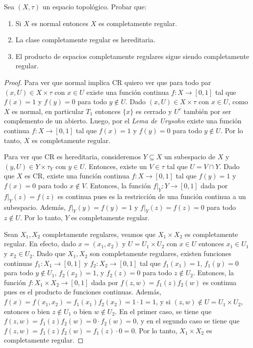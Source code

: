 \documentclass{article}
\theoremstyle{plain}
\theoremstyle{definition}
\newenvironment{ejercicio}[1]{\begin{trivlist}
\item[\hskip \labelsep {\bfseries Ejercicio}\hskip \labelsep {\bfseries #1.}]}{\end{trivlist}}
\begin{document}
\begin{ejercicio}{1}
    Sea \( (X, \tau) \) un espacio topológico. Probar que:
    \begin{enumerate}
        \item Si \( X \) es normal entonces \( X \) es completamente regular.
        \item La clase completamente regular es hereditaria.
        \item El producto de espacios completamente regulares sigue siendo completamente regular.
    \end{enumerate}
\end{ejercicio}
\begin{proof}
    Para ver que normal implica CR quiero ver que para todo par \( (x, U) \in X \times \tau \) con \( x \in U \) existe una función continua \( f : X \to [0, 1] \) tal que \( f(x) = 1 \) y \( f(y) = 0 \) para todo \( y \notin U \).
    Dado \( (x, U) \in X \times \tau \) con \( x \in U \), como \( X \) es normal, en particular \( T_1 \) entonces \( \{ x \} \) es cerrado y \( U^c \) también por ser complemento de un abierto.
    Luego, por el \emph{Lema de Urysohn} existe una función continua \( f : X \to [0, 1] \) tal que \( f(x) = 1 \) y \( f(y) = 0 \) para todo \( y \notin U \). Por lo tanto, \( X \) es completamente regular.

    Para ver que CR es hereditaria, consideremos \( Y \subseteq X \) un subespacio de \( X \) y \( (y, U) \in Y \times \tau_Y \) con \( y \in U \).
    Entonces, existe un \( V \in \tau \) tal que \( U = V \cap Y \). Dado que \( X \) es CR, existe una función continua \( f : X \to [0, 1] \) tal que \( f(y) = 1 \) y \( f(x) = 0 \) para todo \( x \notin V \).
    Entonces, la función \( f|_Y : Y \to [0, 1] \) dada por \( f|_Y(z) = f(z) \) es continua pues es la restricción de una función continua a un subespacio. Además, \( f|_Y(y) = f(y) = 1 \) y \( f|_Y(z) = f(z) = 0 \) para todo \( z \notin U \). Por lo tanto, \( Y \) es completamente regular.

    Sean \( X_1, X_2 \) completamente regulares, veamos que \( X_1 \times X_2 \) es completamente regular. En efecto, dado \( x = (x_1, x_2) \) y \( U = U_1 \times U_2 \) con \( x \in U \) entonces \( x_1 \in U_1 \) y \( x_2 \in U_2 \). Dado que \( X_1, X_2 \) son completamente regulares, existen funciones continuas \( f_1 : X_1 \to [0, 1] \) y \( f_2 : X_2 \to [0, 1] \) tal que \( f_1(x_1) = 1 \), \( f_1(y) = 0 \) para todo \( y \notin U_1 \), \( f_2(x_2) = 1 \), y \( f_2(z) = 0 \) para todo \( z \notin U_2 \). Entonces, la función \( f : X_1 \times X_2 \to [0, 1] \) dada por \( f(z, w) = f_1(z) f_2(w) \) es continua pues es el producto de funciones continuas. Además, \( f(x) = f(x_1, x_2) = f_1(x_1) f_2(x_2) = 1\cdot 1 = 1 \), y si \( (z, w) \notin U = U_1 \times U_2 \), entonces o bien \( z \notin U_1 \) o bien \( w \notin U_2 \). En el primer caso, se tiene que \( f(z, w) = f_1(z)f_2(w) = 0\cdot f_2(w) = 0\), y en el segundo caso se tiene que \( f(z, w) = f_1(z)f_2(w) = f_1(z)\cdot 0 = 0\). Por lo tanto, \( X_1\times X_2 \) es completamente regular.
\end{proof}
\end{document}
